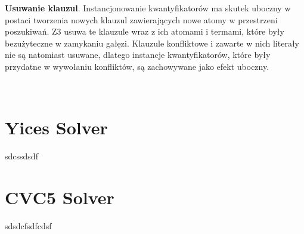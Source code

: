 \textbf{Usuwanie klauzul}. Instancjonowanie kwantyfikatorów ma skutek uboczny w postaci tworzenia nowych klauzul zawierających nowe atomy w przestrzeni poszukiwań. Z3 usuwa te klauzule wraz z ich atomami i termami, które były bezużyteczne w zamykaniu gałęzi. Klauzule konfliktowe i zawarte w nich literały nie są natomiast usuwane, dlatego instancje kwantyfikatorów, które były przydatne w wywołaniu konfliktów, są zachowywane jako efekt uboczny.

\

\section{Yices Solver}
sdcssdsdf

\section{CVC5 Solver}
sdsdcfsdfcdsf
